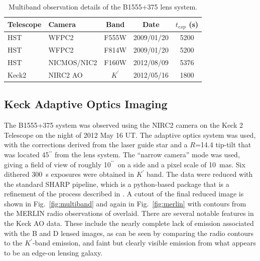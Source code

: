 \documentclass[usenatbib]{mn2e}
\begin{document}
\begin{table}
 \centering
  \caption{Multiband observation details of the B1555+375 lens system.}
  \begin{tabular}{@{}llccc}
  
\hline
  Telescope     &      Camera     &  Band & Date &$t_{exp}$ (s) \\

 \hline
   HST				&		WFPC2    &  F555W		&	2009/01/20	&	5200\\
   HST				&		WFPC2    &  F814W		&	2009/01/20&	5200\\
   HST				&		NICMOS/NIC2	&	F160W	&	2012/08/09 & 5376\\
   Keck2			&		NIRC2 AO	&   $K^\prime$	& 2012/05/16	&  1800\\
   \hline
\end{tabular}
\end{table}

\subsection{Keck Adaptive Optics Imaging}

The B1555+375 system was observed using the NIRC2 camera on the Keck 2
Telescope on the night of 2012 May 16 UT.  The adaptive optics system
was used, with the corrections derived from the laser guide star and a
$R$=14.4 tip-tilt that was located 45$^{\prime\prime}$ from the lens
system.  The ``narrow camera'' mode was used, giving a field of view
of roughly 10$^{\prime\prime}$\ on a side and a pixel scale of 10~mas.
Six dithered 300~s exposures were obtained in $K^{\prime}$ band.  The
data were reduced with the standard SHARP pipeline, which is a
python-based package that is a refinement of the process described in
\citet{Auger_EELS1}.  A cutout of the final reduced image is shown in
Fig.~\ref{fig:multiband} and again in Fig.~\ref{fig:merlin} with
contours from the MERLIN radio observations of \citet{Marlow}
overlaid.  There are several notable features in the Keck AO data.
These include the nearly complete lack of emission associated with the
B and D lensed images, as can be seen by comparing the radio contours
to the $K^\prime$-band emission, and faint but clearly visible
emission from what appears to be an edge-on lensing galaxy.
\end{document}

